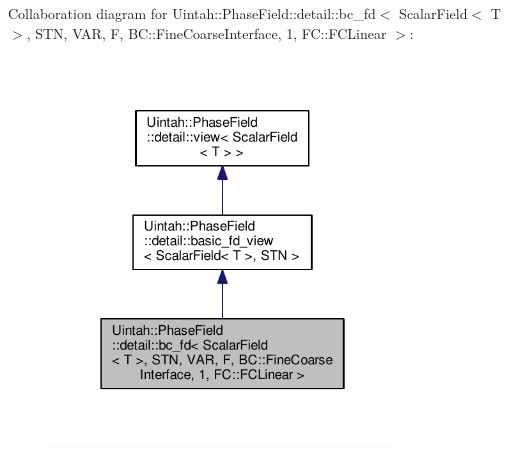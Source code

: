 Collaboration diagram for Uintah\+:\+:Phase\+Field\+:\+:detail\+:\+:bc\+\_\+fd$<$ Scalar\+Field$<$ T $>$, S\+TN, V\+AR, F, BC\+:\+:Fine\+Coarse\+Interface, 1, FC\+:\+:F\+C\+Linear $>$\+:\nopagebreak
\begin{figure}[H]
\begin{center}
\leavevmode
\includegraphics[width=262pt]{classUintah_1_1PhaseField_1_1detail_1_1bc__fd_3_01ScalarField_3_01T_01_4_00_01STN_00_01VAR_00_01b6b075cfbd7ab445b4f77db90fe30ca6}
\end{center}
\end{figure}

